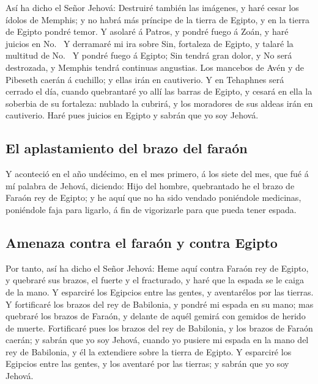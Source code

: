  Así ha dicho el Señor Jehová: Destruiré también las
imágenes, y haré cesar los ídolos de Memphis; y no habrá más príncipe de
la tierra de Egipto, y en la tierra de Egipto pondré temor.
 Y asolaré á Patros, y pondré fuego á Zoán, y haré juicios
en No.~ Y derramaré mi ira sobre Sin, fortaleza de Egipto,
y talaré la multitud de No.~ Y pondré fuego á Egipto; Sin
tendrá gran dolor, y No será destrozada, y Memphis tendrá continuas
angustias.  Los mancebos de Avén y de Pibeseth caerán á
cuchillo; y ellas irán en cautiverio.  Y en Tehaphnes será
cerrado el día, cuando quebrantaré yo allí las barras de Egipto, y
cesará en ella la soberbia de su fortaleza: nublado la cubrirá, y los
moradores de sus aldeas irán en cautiverio.  Haré pues
juicios en Egipto y sabrán que yo soy Jehová.

\hypertarget{el-aplastamiento-del-brazo-del-farauxf3n}{%
\subsection{El aplastamiento del brazo del
faraón}\label{el-aplastamiento-del-brazo-del-farauxf3n}}

 Y aconteció en el año undécimo, en el mes primero, á los
siete del mes, que fué á mí palabra de Jehová, diciendo: 
Hijo del hombre, quebrantado he el brazo de Faraón rey de Egipto; y he
aquí que no ha sido vendado poniéndole medicinas, poniéndole faja para
ligarlo, á fin de vigorizarle para que pueda tener espada.

\hypertarget{amenaza-contra-el-farauxf3n-y-contra-egipto}{%
\subsection{Amenaza contra el faraón y contra
Egipto}\label{amenaza-contra-el-farauxf3n-y-contra-egipto}}

 Por tanto, así ha dicho el Señor Jehová: Heme aquí contra
Faraón rey de Egipto, y quebraré sus brazos, el fuerte y el fracturado,
y haré que la espada se le caiga de la mano.  Y esparciré
los Egipcios entre las gentes, y aventarélos por las tierras.
 Y fortificaré los brazos del rey de Babilonia, y pondré mi
espada en su mano; mas quebraré los brazos de Faraón, y delante de aquél
gemirá con gemidos de herido de muerte.  Fortificaré pues
los brazos del rey de Babilonia, y los brazos de Faraón caerán; y sabrán
que yo soy Jehová, cuando yo pusiere mi espada en la mano del rey de
Babilonia, y él la extendiere sobre la tierra de Egipto.  Y
esparciré los Egipcios entre las gentes, y los aventaré por las tierras;
y sabrán que yo soy Jehová.

